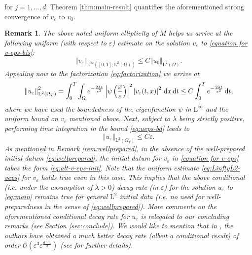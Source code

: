 \documentclass[preprint, 12pt]{amsart}
\numberwithin{equation}{section}
\newtheorem{remark}[theorem]{Remark}        %
\numberwithin{equation}{section}
\newcommand{\eps}{\varepsilon}
\begin{document}
for $j=1,\dots,d$. Theorem \ref{thm:main-result} quantifies the aforementioned strong convergence of $v_\eps$ to $v_0$.
\begin{remark}\label{rem:decay-ueps}
The above noted uniform ellipticity of $M$ helps us arrive at the following uniform (with respect to $\eps$) estimate on the solution $v_\eps$ to \eqref{equation for v-eps-bis}:
\begin{equation}\label{eq:LinftyL2-veps}
\left\Vert v_\eps \right\Vert_{\mathrm L^\infty([0,T];\mathrm L^2(\Omega))}
\le C \left\Vert u_0 \right\Vert_{\mathrm L^2(\Omega)}.
\end{equation}
Appealing now to the factorization \eqref{eq:factorization} we arrive at
\begin{equation}\label{eq:ueps-bd}
\left\Vert u_\eps \right\Vert^2_{\mathrm L^2(\Omega_T)} 
= \int_0^T \int_\Omega e^{-\frac{2\lambda t}{\eps^2}} \left\vert \psi\left(\frac{x}{\eps}\right)\right\vert^2 \left\vert v_\eps(t,x) \right\vert^2\, {\rm d}x\, {\rm d}t
\le C \int_0^T e^{-\frac{2\lambda t}{\eps^2}}\, {\rm d}t,
\end{equation}
where we have used the boundedness of the eigenfunction $\psi$ in $\mathrm L^\infty$ and the uniform bound on $v_\eps$ mentioned above. Next, subject to $\lambda$ being strictly positive, performing time integration in the bound \eqref{eq:ueps-bd} leads to 
\begin{equation}\label{eq:decay-ueps}
\left\Vert u_\eps \right\Vert_{\mathrm L^2(\Omega_T)} \le C \eps.
\end{equation}
As mentioned in Remark \ref{rem:wellprepared}, in the absence of the well-prepared initial datum \eqref{eq:wellprepared}, the initial datum for $v_\eps$ in \eqref{equation for v-eps} takes the form \eqref{eq:alt-v-eps-init}. Note that the uniform estimate \eqref{eq:LinftyL2-veps} for $v_\eps$ holds true even in this case. This implies that the above conditional (i.e. under the assumption of $\lambda>0$) decay rate (in $\eps$) for the solution $u_\eps$ to \eqref{eq:main} remains true for general $\mathrm L^2$ initial data (i.e. no need for well-preparedness in the sense of \eqref{eq:wellprepared}). More comments on the aforementioned conditional decay rate for $u_\eps$ is relegated to our concluding remarks (see Section \ref{sec:conclude}). We would like to mention that in \cite{allaire2012homogenization}, the authors have obtained a much better decay rate (albeit a conditional result) of order $\mathcal{O}(\eps^3 \eps^{\frac{d-1}{2}})$ (see \cite[Remark 5.2]{allaire2012homogenization} for further details). 
\end{remark}
\end{document}
